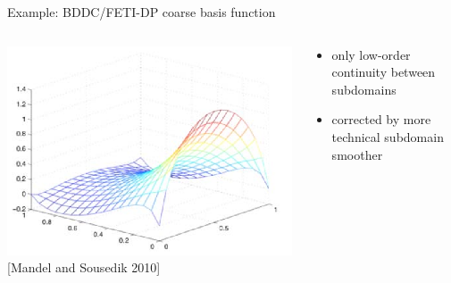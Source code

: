 \begin{frame}{Example: BDDC/FETI-DP coarse basis function}
    \begin{columns}
    \begin{column}{0.6\textwidth}
      \includegraphics[width=\textwidth]{figures/MandelSousedikBDDCCoarseBasis} \\
      {\small [Mandel and Sousedik 2010]}
    \end{column}
    \begin{column}{0.4\textwidth}
      \begin{itemize}
      \item only low-order continuity between subdomains
      \item corrected by more technical subdomain smoother
      \end{itemize}
    \end{column}
  \end{columns}
\end{frame}
